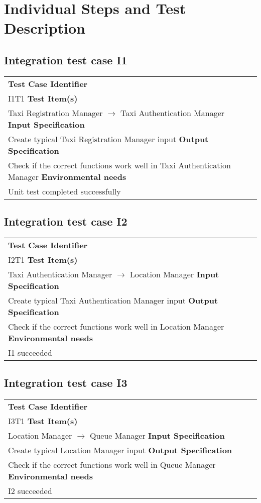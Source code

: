 \section{Individual Steps and Test Description}
\subsection{Integration test case I1}
	\begin{tabular} {l p{7cm}}
		\hline \textbf{Test Case Identifier} & \\ I1T1
		\hline \textbf{Test Item(s)} & \\ Taxi Registration Manager $\rightarrow$ Taxi Authentication Manager  
		\hline \textbf{Input Specification} & \\ Create typical Taxi Registration Manager input 
		\hline \textbf{Output Specification} & \\ Check if the correct functions work well in Taxi Authentication Manager 
		\hline \textbf{Environmental needs} & \\ Unit test completed successfully
		\hline 
	\end{tabular}
\subsection{Integration test case I2}
	\begin{tabular} {l p{9cm}}
		\hline \textbf{Test Case Identifier} & \\ I2T1
		\hline \textbf{Test Item(s)} & \\ Taxi Authentication Manager $\rightarrow$ Location Manager
		\hline \textbf{Input Specification} & \\ Create typical Taxi Authentication Manager input
		\hline \textbf{Output Specification} & \\ Check if the correct functions work well in Location Manager
		\hline \textbf{Environmental needs} & \\ I1 succeeded
		\hline 
	\end{tabular}
\subsection{Integration test case I3}
	\begin{tabular} {l p{9cm}}
		\hline \textbf{Test Case Identifier} & \\ I3T1
		\hline \textbf{Test Item(s)} & \\ Location Manager $\rightarrow$ Queue Manager
		\hline \textbf{Input Specification} & \\ Create typical Location Manager input
		\hline \textbf{Output Specification} & \\ Check if the correct functions work well in Queue Manager
		\hline \textbf{Environmental needs} & \\ I2 succeeded
		\hline 
	\end{tabular}
